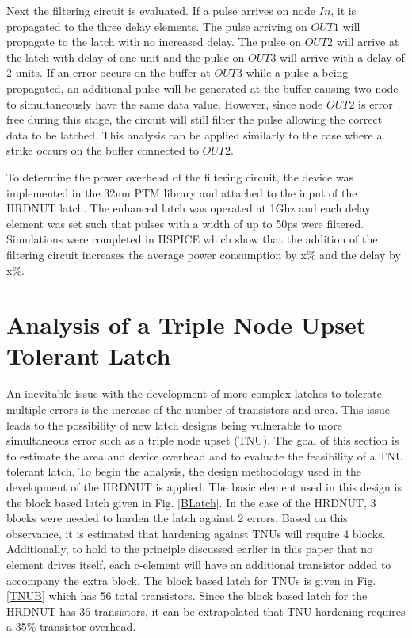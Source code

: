 Next the filtering circuit is evaluated. If a pulse arrives on node $In$, it is propagated to the three delay elements. The pulse arriving on $OUT1$ will propagate to the latch with no increased delay. The pulse on $OUT2$ will arrive at the latch with delay of one unit and the pulse on $OUT3$ will arrive with a delay of 2 units. If an error occurs on the buffer at $OUT3$ while a pulse a being propagated, an additional pulse will be generated at the buffer causing two node to simultaneously have the same data value. However, since node $OUT2$ is error free during this stage, the circuit will still filter the pulse allowing the correct data to be latched. This analysis can be applied similarly to the case where a strike occurs on the buffer connected to $OUT2$.

To determine the power overhead of the filtering circuit, the device was implemented in the 32nm PTM library and attached to the input of the HRDNUT latch. The enhanced latch was operated at 1Ghz and each delay element was set such that pulses with a width of up to 50ps were filtered. Simulations were completed in HSPICE which show that the addition of the filtering circuit increases the average power consumption by x\% and the delay by x\%.

\section{Analysis of a Triple Node Upset Tolerant Latch}
An inevitable issue with the development of more complex latches to tolerate multiple errors is the increase of the number of transistors and area. This issue leads to the possibility of new latch designs being vulnerable to more simultaneous error such as a triple node upset (TNU). The goal of this section is to estimate the area and device overhead and to evaluate the feasibility of a TNU tolerant latch. To begin the analysis, the design methodology used in the development of the HRDNUT is applied. The basic element used in this design is the block based latch given in Fig. \ref{BLatch}. In the case of the HRDNUT, 3 blocks were needed to harden the latch against 2 errors. Based on this observance, it is estimated that hardening against TNUs will require 4 blocks. Additionally, to hold to the principle discussed earlier in this paper that no element drives itself, each c-element will have an additional transistor added to accompany the extra block. The block based latch for TNUs is given in Fig. \ref{TNUB} which has 56 total transistors. Since the block based latch for the HRDNUT has 36 transistors, it can be extrapolated that TNU hardening requires a 35\% transistor overhead.

